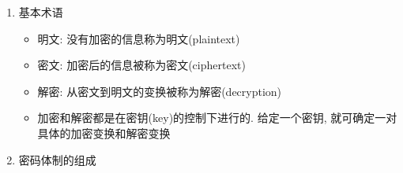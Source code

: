 \documentclass[UTF8]{ctexart}
\begin{document}
\begin{enumerate}
\begin{enumerate}
            \item 基本术语
            \begin{itemize}
                \item 明文: 没有加密的信息称为明文(plaintext)
                \item 密文: 加密后的信息被称为密文(ciphertext)
                \item 解密: 从密文到明文的变换被称为解密(decryption)
                \renewcommand{\labelitemi}{\scriptsize$\blacksquare$}
                \item 加密和解密都是在密钥(key)的控制下进行的. 给定一个密钥, 就可确定一对具体的加密变换和解密变换
            \end{itemize}
            \item 密码体制的组成

\end{enumerate}
\end{enumerate}
\end{document}
